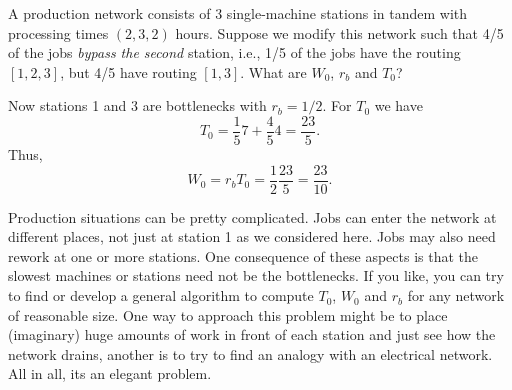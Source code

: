 \begin{exercise}
  A production network consists of 3 single-machine stations in tandem
  with processing times $(2, 3, 2)$ hours.  Suppose we modify this
  network such that 4/5 of the jobs \emph{bypass the second} station,
  i.e., 1/5 of the jobs have the routing $[1,2,3]$, but 4/5 have
  routing $[1,3]$.  What are $W_0$, $r_b$ and $T_0$?
\begin{solution}
  Now stations 1 and 3 are bottlenecks with $r_b = 1/2$. For $T_0$ we have
  \begin{equation*}
    T_0 = \frac15 7 + \frac45 4= \frac{23}5.
  \end{equation*}
Thus, 
\begin{equation*}
W_0 = r_b T_0 = \frac 12 \frac{23}5 = \frac{23}{10}.
\end{equation*}
\end{solution}
\end{exercise}



Production situations can be pretty  complicated. Jobs can enter the network at different places, not  just at station 1 as we considered here. Jobs may also need rework  at one or more stations. One consequence of these aspects is that   the slowest machines or stations need not be the bottlenecks. If you like, you can try to find or develop a general algorithm to compute
 $T_0$, $W_0$ and $r_b$ for any network of reasonable size.  One way to approach this problem might be to  place (imaginary) huge  amounts of work in front of each station and just see how the network drains, another is to try to find an analogy with an electrical network. All in all, its an elegant  problem.





